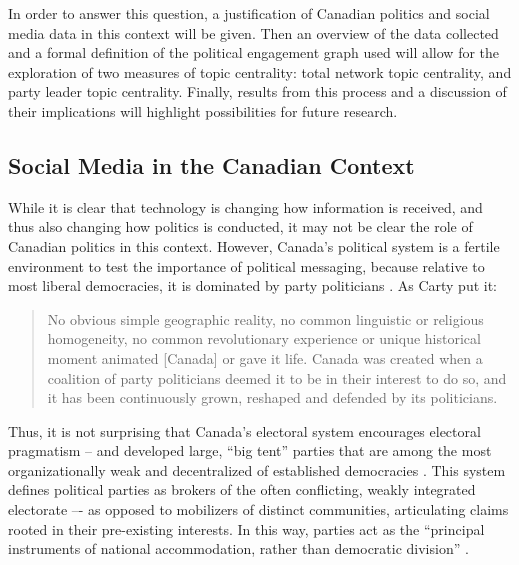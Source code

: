 In order to answer this question, a justification of Canadian politics and
social media data in this context will be given. Then an overview of the data
collected and a formal definition of the political engagement graph used will
allow for the exploration of two measures of topic centrality: total network
topic centrality, and party leader topic centrality. Finally, results from this
process and a discussion of their implications will highlight possibilities for
future research.  

\subsection{Social Media in the Canadian Context}

While it is clear that technology is changing how information is received, and
thus also changing how politics is conducted, it may not be clear the role of
Canadian politics in this context. However, Canada’s political system is a
fertile environment to test the importance of political messaging, because
relative to most liberal democracies, it is dominated by party
politicians \cite{cross2004contours}. As Carty put it: 

\begin{quote}
  No obvious simple geographic reality, no common linguistic or religious
  homogeneity, no common revolutionary experience or unique historical moment
  animated [Canada] or gave it life. Canada was created when a coalition of party
  politicians deemed it to be in their interest to do so, and it has been
  continuously grown, reshaped and defended by its politicians.\cite{carty2010political}
\end{quote}

Thus, it is not surprising that Canada’s electoral system
encourages electoral pragmatism – and developed large, ``big tent'' parties that
are among the most organizationally weak and decentralized of established
democracies \cite{cross2004contours}. This system defines political parties as brokers of the often
conflicting, weakly integrated electorate –- as opposed to mobilizers of
distinct communities, articulating claims rooted in their pre-existing
interests. In this way, parties act as the ``principal instruments of national
accommodation, rather than democratic division'' \cite{carty2010political}.

